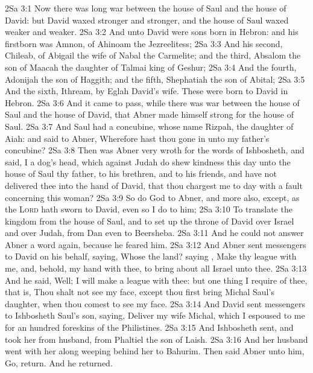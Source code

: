 \vs 2Sa 3:1 Now there was long war between the house of Saul and the house of David: but David waxed stronger and stronger, and the house of Saul waxed weaker and weaker.
\vs 2Sa 3:2 And unto David were sons born in Hebron: and his firstborn was Amnon, of Ahinoam the Jezreelitess;
\vs 2Sa 3:3 And his second, Chileab, of Abigail the wife of Nabal the Carmelite; and the third, Absalom the son of Maacah the daughter of Talmai king of Geshur;
\vs 2Sa 3:4 And the fourth, Adonijah the son of Haggith; and the fifth, Shephatiah the son of Abital;
\vs 2Sa 3:5 And the sixth, Ithream, by Eglah David's wife. These were born to David in Hebron.
\vs 2Sa 3:6 And it came to pass, while there was war between the house of Saul and the house of David, that Abner made himself strong for the house of Saul.
\vs 2Sa 3:7 And Saul had a concubine, whose name  Rizpah, the daughter of Aiah: and  said to Abner, Wherefore hast thou gone in unto my father's concubine?
\vs 2Sa 3:8 Then was Abner very wroth for the words of Ishbosheth, and said,  I a dog's head, which against Judah do shew kindness this day unto the house of Saul thy father, to his brethren, and to his friends, and have not delivered thee into the hand of David, that thou chargest me to day with a fault concerning this woman?
\vs 2Sa 3:9 So do God to Abner, and more also, except, as the \textsc{Lord} hath sworn to David, even so I do to him;
\vs 2Sa 3:10 To translate the kingdom from the house of Saul, and to set up the throne of David over Israel and over Judah, from Dan even to Beersheba.
\vs 2Sa 3:11 And he could not answer Abner a word again, because he feared him.
\vs 2Sa 3:12 And Abner sent messengers to David on his behalf, saying, Whose  the land? saying , Make thy league with me, and, behold, my hand  with thee, to bring about all Israel unto thee.
\vs 2Sa 3:13 And he said, Well; I will make a league with thee: but one thing I require of thee, that is, Thou shalt not see my face, except thou first bring Michal Saul's daughter, when thou comest to see my face.
\vs 2Sa 3:14 And David sent messengers to Ishbosheth Saul's son, saying, Deliver  my wife Michal, which I espoused to me for an hundred foreskins of the Philistines.
\vs 2Sa 3:15 And Ishbosheth sent, and took her from  husband,  from Phaltiel the son of Laish.
\vs 2Sa 3:16 And her husband went with her along weeping behind her to Bahurim. Then said Abner unto him, Go, return. And he returned.
